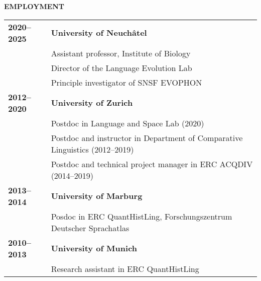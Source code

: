 \documentclass[11pt]{article}
\begin{document}
\vskip 12pt
\begin{flushleft}
{\bf EMPLOYMENT}
\end{flushleft}
\begin{tabular}{lp{5.5in}}

\bf 2020--2025 & {\bf University of Neuchâtel} \\
& Assistant professor, Institute of Biology \\
& Director of the Language Evolution Lab \\
& Principle investigator of SNSF EVOPHON \\

\bf 2012--2020 & {\bf University of Zurich} \\

& Postdoc in Language and Space Lab (2020) \\
& Postdoc and instructor in Department of Comparative Linguistics (2012--2019) \\
& Postdoc and technical project manager in ERC ACQDIV (2014--2019) \\


\bf 2013--2014 & {\bf University of Marburg} \\
& Posdoc in ERC QuantHistLing, Forschungszentrum Deutscher Sprachatlas \\

\bf 2010--2013 & {\bf University of Munich} \\
& Research assistant in ERC QuantHistLing \\


\end{tabular}
\end{document}
